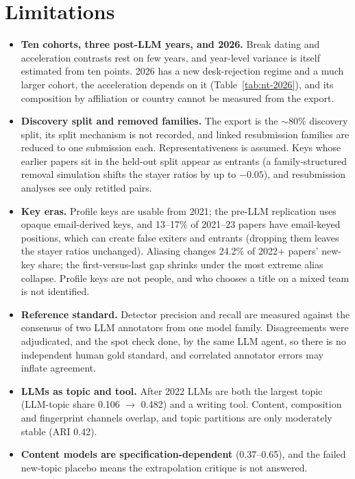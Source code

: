 \section{Limitations}
\label{sec:nt-limitations}

\begin{itemize}
\item \textbf{Ten cohorts, three post-LLM years, and 2026.} Break dating and acceleration contrasts rest on few years, and year-level variance is itself estimated from ten points. 2026 has a new desk-rejection regime and a much larger cohort, the acceleration depends on it (Table~\ref{tab:nt-2026}), and its composition by affiliation or country cannot be measured from the export.
\item \textbf{Discovery split and removed families.} The export is the ${\sim}80\%$ discovery split, its split mechanism is not recorded, and linked resubmission families are reduced to one submission each. Representativeness is assumed. Keys whose earlier papers sit in the held-out split appear as entrants (a family-structured removal simulation shifts the stayer ratios by up to $-0.05$), and resubmission analyses see only retitled pairs.
\item \textbf{Key eras.} Profile keys are usable from 2021; the pre-LLM replication uses opaque email-derived keys, and 13--17\% of 2021--23 papers have email-keyed positions, which can create false exiters and entrants (dropping them leaves the stayer ratios unchanged). Aliasing changes 24.2\% of 2022+ papers' new-key share; the first-versus-last gap shrinks under the most extreme alias collapse. Profile keys are not people, and who chooses a title on a mixed team is not identified.
\item \textbf{Reference standard.} Detector precision and recall are measured against the consensus of two LLM annotators from one model family. Disagreements were adjudicated, and the spot check done, by the same LLM agent, so there is no independent human gold standard, and correlated annotator errors may inflate agreement.
\item \textbf{LLMs as topic and tool.} After 2022 LLMs are both the largest topic (LLM-topic share 0.106 $\rightarrow$ 0.482) and a writing tool. Content, composition and fingerprint channels overlap, and topic partitions are only moderately stable (ARI 0.42).
\item \textbf{Content models are specification-dependent} (0.37--0.65), and the failed new-topic placebo means the extrapolation critique is not answered.

\end{itemize}
